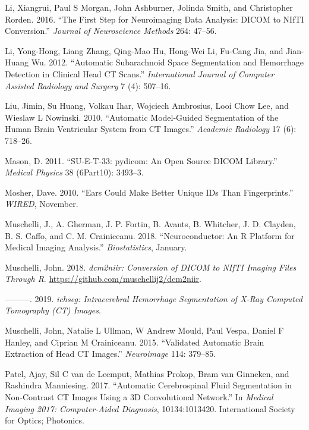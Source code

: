 \documentclass[]{elsarticle} %
\begin{document}
\leavevmode\hypertarget{ref-dcm2niix}{}%
Li, Xiangrui, Paul S Morgan, John Ashburner, Jolinda Smith, and Christopher Rorden. 2016. ``The First Step for Neuroimaging Data Analysis: DICOM to NIfTI Conversion.'' \emph{Journal of Neuroscience Methods} 264: 47--56.

\leavevmode\hypertarget{ref-li2012automatic}{}%
Li, Yong-Hong, Liang Zhang, Qing-Mao Hu, Hong-Wei Li, Fu-Cang Jia, and Jian-Huang Wu. 2012. ``Automatic Subarachnoid Space Segmentation and Hemorrhage Detection in Clinical Head CT Scans.'' \emph{International Journal of Computer Assisted Radiology and Surgery} 7 (4): 507--16.

\leavevmode\hypertarget{ref-liu2010automatic}{}%
Liu, Jimin, Su Huang, Volkau Ihar, Wojciech Ambrosius, Looi Chow Lee, and Wieslaw L Nowinski. 2010. ``Automatic Model-Guided Segmentation of the Human Brain Ventricular System from CT Images.'' \emph{Academic Radiology} 17 (6): 718--26.

\leavevmode\hypertarget{ref-pydicom}{}%
Mason, D. 2011. ``SU-E-T-33: pydicom: An Open Source DICOM Library.'' \emph{Medical Physics} 38 (6Part10): 3493--3.

\leavevmode\hypertarget{ref-mosher_2010}{}%
Mosher, Dave. 2010. ``Ears Could Make Better Unique IDs Than Fingerprints.'' \emph{WIRED}, November.

\leavevmode\hypertarget{ref-neuroconductor}{}%
Muschelli, J., A. Gherman, J. P. Fortin, B. Avants, B. Whitcher, J. D. Clayden, B. S. Caffo, and C. M. Crainiceanu. 2018. ``Neuroconductor: An R Platform for Medical Imaging Analysis.'' \emph{Biostatistics}, January.

\leavevmode\hypertarget{ref-dcm2niir}{}%
Muschelli, John. 2018. \emph{dcm2niir: Conversion of DICOM to NIfTI Imaging Files Through R}. \url{https://github.com/muschellij2/dcm2niir}.

\leavevmode\hypertarget{ref-ichseg}{}%
---------. 2019. \emph{ichseg: Intracerebral Hemorrhage Segmentation of X-Ray Computed Tomography (CT) Images}.

\leavevmode\hypertarget{ref-ctbet}{}%
Muschelli, John, Natalie L Ullman, W Andrew Mould, Paul Vespa, Daniel F Hanley, and Ciprian M Crainiceanu. 2015. ``Validated Automatic Brain Extraction of Head CT Images.'' \emph{Neuroimage} 114: 379--85.

\leavevmode\hypertarget{ref-patel2017automatic}{}%
Patel, Ajay, Sil C van de Leemput, Mathias Prokop, Bram van Ginneken, and Rashindra Manniesing. 2017. ``Automatic Cerebrospinal Fluid Segmentation in Non-Contrast CT Images Using a 3D Convolutional Network.'' In \emph{Medical Imaging 2017: Computer-Aided Diagnosis}, 10134:1013420. International Society for Optics; Photonics.
\end{document}
